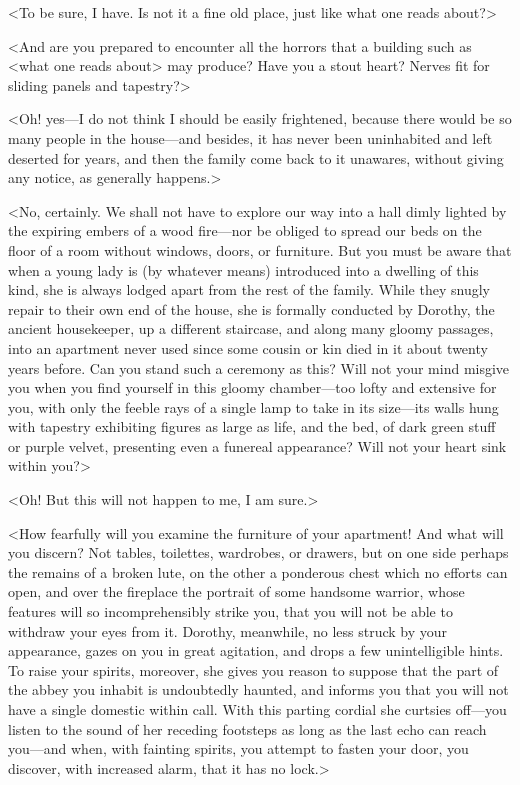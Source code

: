  <To be sure, I have. Is not it a fine old place, just like what one reads about?> 

 <And are you prepared to encounter all the horrors that a building such as <what one reads about> may produce? Have you a stout heart? Nerves fit for sliding panels and tapestry?> 

 <Oh! yes—I do not think I should be easily frightened, because there would be so many people in the house—and besides, it has never been uninhabited and left deserted for years, and then the family come back to it unawares, without giving any notice, as generally happens.> 

 <No, certainly. We shall not have to explore our way into a hall dimly lighted by the expiring embers of a wood fire—nor be obliged to spread our beds on the floor of a room without windows, doors, or furniture. But you must be aware that when a young lady is (by whatever means) introduced into a dwelling of this kind, she is always lodged apart from the rest of the family. While they snugly repair to their own end of the house, she is formally conducted by Dorothy, the ancient housekeeper, up a different staircase, and along many gloomy passages, into an apartment never used since some cousin or kin died in it about twenty years before. Can you stand such a ceremony as this? Will not your mind misgive you when you find yourself in this gloomy chamber—too lofty and extensive for you, with only the feeble rays of a single lamp to take in its size—its walls hung with tapestry exhibiting figures as large as life, and the bed, of dark green stuff or purple velvet, presenting even a funereal appearance? Will not your heart sink within you?> 

 <Oh! But this will not happen to me, I am sure.> 

 <How fearfully will you examine the furniture of your apartment! And what will you discern? Not tables, toilettes, wardrobes, or drawers, but on one side perhaps the remains of a broken lute, on the other a ponderous chest which no efforts can open, and over the fireplace the portrait of some handsome warrior, whose features will so incomprehensibly strike you, that you will not be able to withdraw your eyes from it. Dorothy, meanwhile, no less struck by your appearance, gazes on you in great agitation, and drops a few unintelligible hints. To raise your spirits, moreover, she gives you reason to suppose that the part of the abbey you inhabit is undoubtedly haunted, and informs you that you will not have a single domestic within call. With this parting cordial she curtsies off—you listen to the sound of her receding footsteps as long as the last echo can reach you—and when, with fainting spirits, you attempt to fasten your door, you discover, with increased alarm, that it has no lock.> 

